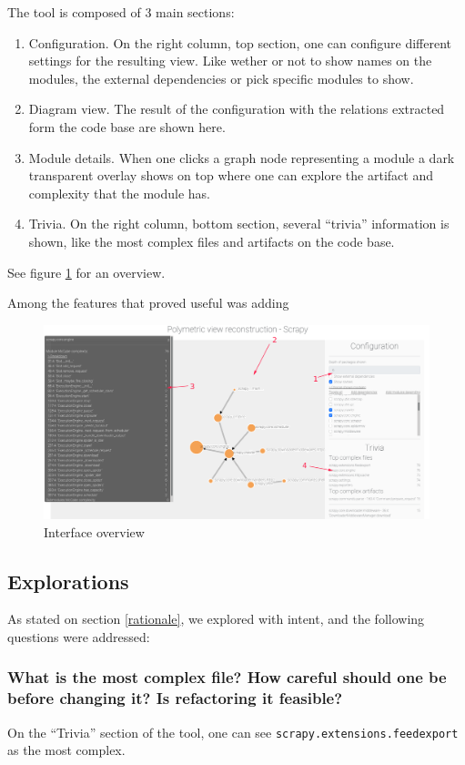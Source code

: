 \documentclass[a4paper,11pt]{article}
\begin{document}
The tool is composed of 3 main sections:

\begin{enumerate}
\item Configuration. On the right column, top section, one can configure different settings for the resulting view. Like wether or not to show names on the modules, the external dependencies or pick specific modules to show.
\item Diagram view. The result of the configuration with the relations extracted form the code base are shown here.
\item Module details. When one clicks a graph node representing a module a dark transparent overlay shows on top where one can explore the artifact and complexity that the module has.
\item Trivia. On the right column, bottom section, several ``trivia'' information is shown, like the most complex files and artifacts on the code base.
\end{enumerate}

See figure \ref{ui} for an overview.

Among the features that proved useful was adding 

\begin{figure}
\includegraphics[width=.9\linewidth]{../screenshots/ui.png}
\caption{Interface overview}
\label{ui}
\end{figure}


\subsection{Explorations}
\label{sec:org7929cba}
As stated on section \ref{rationale}, we explored with intent, and the following questions were addressed:

\subsubsection{What is the most complex file? How careful should one be before changing it? Is refactoring it feasible?}
\label{sec:org80abbec}
On the ``Trivia'' section of the tool, one can see \texttt{scrapy.extensions.feedexport} as the most complex.
\end{document}
